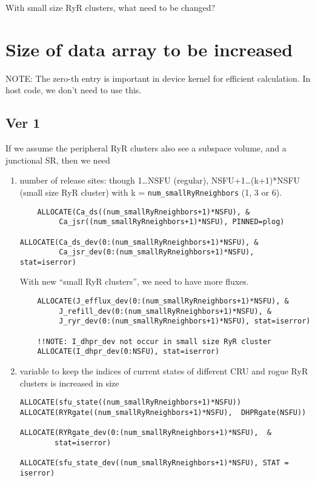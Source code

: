 With small size RyR clusters, what need to be changed? 
\section{Size of data array to be increased}
\label{sec:size_data_change}

NOTE: The zero-th entry is important in device kernel for efficient calculation.
In host code, we don't need to use this.

\subsection{Ver 1}
\label{sev:ver_1}

If we assume the peripheral RyR clusters also see a subspace volume, and a
junctional SR, then we need
\begin{enumerate}
  \item number of release sites: though 1\ldots NSFU (regular),
  NSFU+1\ldots (k+1)*NSFU (small size RyR cluster) with k =
  \verb!num_smallRyRneighbors! (1, 3 or 6).
\begin{verbatim}
    ALLOCATE(Ca_ds((num_smallRyRneighbors+1)*NSFU), &
         Ca_jsr((num_smallRyRneighbors+1)*NSFU), PINNED=plog)    

ALLOCATE(Ca_ds_dev(0:(num_smallRyRneighbors+1)*NSFU), &
         Ca_jsr_dev(0:(num_smallRyRneighbors+1)*NSFU), stat=iserror)
\end{verbatim}
With new ``small RyR clusters'', we need to have more fluxes.
\begin{verbatim}
    ALLOCATE(J_efflux_dev(0:(num_smallRyRneighbors+1)*NSFU), &
         J_refill_dev(0:(num_smallRyRneighbors+1)*NSFU), &
         J_ryr_dev(0:(num_smallRyRneighbors+1)*NSFU), stat=iserror)
    
    !!NOTE: I_dhpr_dev not occur in small size RyR cluster
    ALLOCATE(I_dhpr_dev(0:NSFU), stat=iserror)
\end{verbatim}

  \item variable to keep the indices of current states of different CRU
  and rogue RyR clusters is increased in size
  \begin{verbatim}
ALLOCATE(sfu_state((num_smallRyRneighbors+1)*NSFU))
ALLOCATE(RYRgate((num_smallRyRneighbors+1)*NSFU),  DHPRgate(NSFU))

ALLOCATE(RYRgate_dev(0:(num_smallRyRneighbors+1)*NSFU),  &
        stat=iserror)
    
ALLOCATE(sfu_state_dev((num_smallRyRneighbors+1)*NSFU), STAT = iserror)
  \end{verbatim}
  

\end{enumerate}
